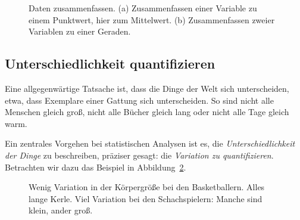 \documentclass[
  letterpaper,
  oneside,
  open=any]{scrbook}
\theoremstyle{definition}
\theoremstyle{definition}
\theoremstyle{definition}
\theoremstyle{remark}
\begin{document}
\begin{figure}
\begin{minipage}{0.45\linewidth}
{}


\end{minipage}%

\caption{\label{fig-zsmnfassen}Daten zusammenfassen. (a) Zusammenfassen
einer Variable zu einem Punktwert, hier zum Mittelwert. (b)
Zusammenfassen zweier Variablen zu einer Geraden.}

\end{figure}%

\subsection{Unterschiedlichkeit
quantifizieren}\label{unterschiedlichkeit-quantifizieren}

Eine allgegenwärtige Tatsache ist, dass die Dinge der Welt sich
unterscheiden, etwa, dass Exemplare einer Gattung sich unterscheiden. So
sind nicht alle Menschen gleich groß, nicht alle Bücher gleich lang oder
nicht alle Tage gleich warm.

Ein zentrales Vorgehen bei statistischen Analysen ist es, die
\emph{Unterschiedlichkeit der Dinge} zu beschreiben, präziser gesagt:
die \emph{Variation zu quantifizieren}. Betrachten wir dazu das Beispiel
in Abbildung~\ref{fig-groesse}.

\begin{figure}


\caption{\label{fig-groesse}Wenig Variation in der Körpergröße bei den
Basketballern. Alles lange Kerle. Viel Variation bei den Schachspielern:
Manche sind klein, ander groß.}

\end{figure}%
\end{document}
